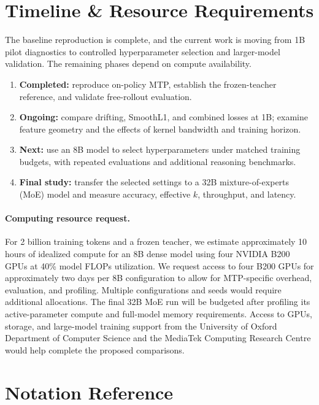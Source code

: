 \documentclass{article}
\begin{document}
\section{Timeline \& Resource Requirements}
\label{sec:timeline-resources}
The baseline reproduction is complete, and the current work is moving from 1B pilot diagnostics to controlled hyperparameter selection and larger-model validation. The remaining phases depend on compute availability.
\begin{enumerate}
 \item \textbf{Completed:} reproduce on-policy MTP, establish the frozen-teacher reference, and validate free-rollout evaluation.
 \item \textbf{Ongoing:} compare drifting, SmoothL1, and combined losses at 1B; examine feature geometry and the effects of kernel bandwidth and training horizon.
 \item \textbf{Next:} use an 8B model to select hyperparameters under matched training budgets, with repeated evaluations and additional reasoning benchmarks.
 \item \textbf{Final study:} transfer the selected settings to a 32B mixture-of-experts (MoE) model and measure accuracy, effective $k$, throughput, and latency.
\end{enumerate}

\paragraph{Computing resource request.}
For 2 billion training tokens and a frozen teacher, we estimate approximately 10 hours of idealized compute for an 8B dense model using four NVIDIA B200 GPUs at 40\% model FLOPs utilization. We request access to four B200 GPUs for approximately two days per 8B configuration to allow for MTP-specific overhead, evaluation, and profiling. Multiple configurations and seeds would require additional allocations. The final 32B MoE run will be budgeted after profiling its active-parameter compute and full-model memory requirements. Access to GPUs, storage, and large-model training support from the University of Oxford Department of Computer Science and the MediaTek Computing Research Centre would help complete the proposed comparisons.




\section{Notation Reference}
\label{app:notation}
\end{document}
